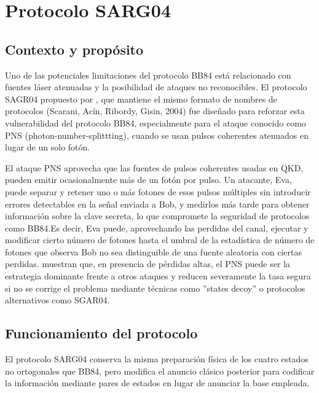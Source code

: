 \section{Protocolo SARG04}

\subsection{Contexto y propósito}
Uno de las potenciales limitaciones del protocolo BB84 está relacionado con fuentes láser atenuadas y la posibilidad de ataques no reconocibles. El protocolo SAGR04  propuesto por \cite{sgar04}, que mantiene el mismo formato de nombres de protocolos (Scarani, Acín, Ribordy, Gisin, 2004) fue diseñado para reforzar esta vulnerabilidad del protocolo BB84, especialmente para el ataque conocido como PNS (photon-number-splittting), cuando se usan pulsos coherentes atenuados en lugar de un solo fotón.
\newline

El ataque PNS aprovecha que las fuentes de pulsos coherentes  usadas en QKD, pueden emitir ocasionalmente más de un fotón por pulso. Un atacante, Eva,  puede separar y retener uno o más fotones de esos pulsos múltiples sin introducir errores detectables en la señal enviada a Bob, y medirlos más tarde para obtener información sobre la clave secreta, lo que compromete la seguridad de protocolos como BB84.Es decir, Eva puede, aprovechando las perdidas del canal, ejecutar y modificar cierto número de fotones hasta el umbral de la estadística de número de fotones que observa Bob no sea distinguible de una fuente aleatoria con ciertas perdidas.  \cite{lutkenhaus2002} muestran que, en presencia de pérdidas altas, el PNS puede ser la estrategia dominante frente a otros ataques y reducen severamente la tasa segura si no se corrige el problema mediante técnicas como ''states decoy'' \citep{hwang2003} o protocolos alternativos como SGAR04.

\subsection{Funcionamiento del protocolo}

El protocolo SARG04  conserva la misma preparación física de los cuatro estados no ortogonales que BB84, pero modifica el anuncio clásico posterior para codificar la información mediante pares de estados en lugar de anunciar la base empleada.
\newline

